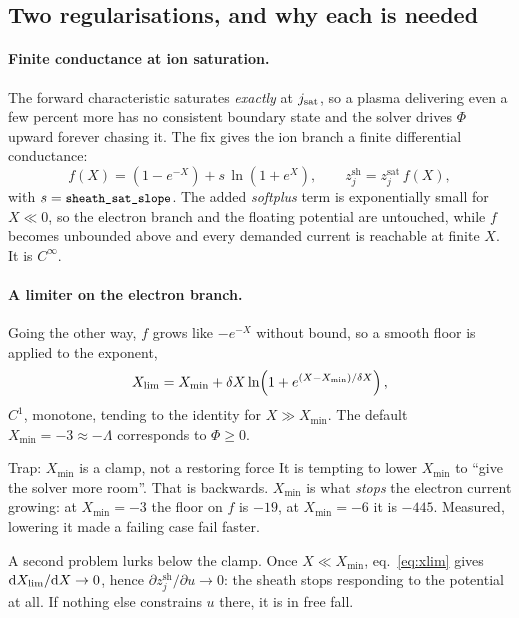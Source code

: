 \documentclass[11pt,a4paper]{article}
\newcommand{\zjsat}{z^{\mathrm{sat}}_{j}}
\newcommand{\zjsh}{z^{\mathrm{sh}}_{j}}
\newcommand{\dd}{\mathrm{d}}
\newcommand{\code}[1]{\texttt{\small #1}}
\begin{document}
\subsection{Two regularisations, and why each is needed}

\paragraph{Finite conductance at ion saturation.} The forward characteristic saturates \emph{exactly}
at $j_{\rm sat}$, so a plasma delivering even a few percent more has no consistent boundary state and
the solver drives $\Phi$ upward forever chasing it. The fix gives the ion branch a finite differential
conductance:
\begin{equation}
  f(X) = \left(1 - e^{-X}\right) + s\,\ln\!\left(1 + e^{X}\right),\qquad \zjsh = \zjsat\, f(X),
  \label{eq:fchar}
\end{equation}
with $s=\code{sheath\_sat\_slope}$. The added \emph{softplus} term is exponentially small for $X\ll0$,
so the electron branch and the floating potential are untouched, while $f$ becomes unbounded above and
every demanded current is reachable at finite $X$. It is $C^\infty$.

\paragraph{A limiter on the electron branch.} Going the other way, $f$ grows like $-e^{-X}$ without
bound, so a smooth floor is applied to the exponent,
\begin{equation}
  X_{\rm lim} = X_{\min} + \delta X \ln\!\left(1 + e^{(X - X_{\min})/\delta X}\right),
  \label{eq:xlim}
\end{equation}
$C^1$, monotone, tending to the identity for $X\gg X_{\min}$. The default $X_{\min}=-3\approx-\Lambda$
corresponds to $\Phi\ge0$.

\begin{warnbox}{Trap: $X_{\min}$ is a clamp, not a restoring force}
It is tempting to lower $X_{\min}$ to ``give the solver more room''. That is backwards. $X_{\min}$ is
what \emph{stops} the electron current growing: at $X_{\min}=-3$ the floor on $f$ is $-19$, at
$X_{\min}=-6$ it is $-445$. Measured, lowering it made a failing case fail faster.

A second problem lurks below the clamp. Once $X\ll X_{\min}$, eq.~\eqref{eq:xlim} gives
$\dd X_{\rm lim}/\dd X\to0$, hence $\partial\zjsh/\partial u\to0$: the sheath stops responding to the
potential at all. If nothing else constrains $u$ there, it is in free fall.
\end{warnbox}
\end{document}
